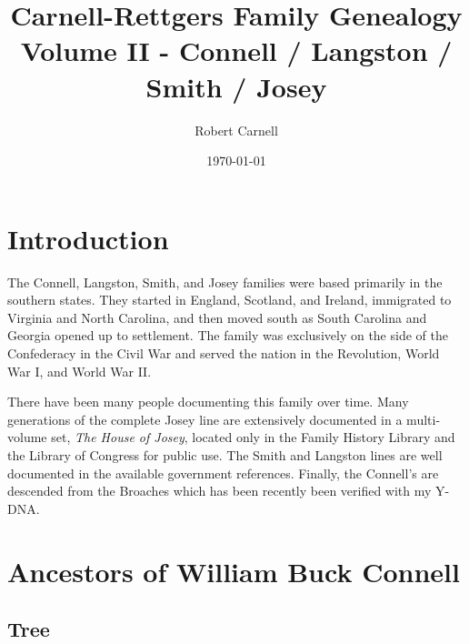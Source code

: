 \documentclass[11pt,letter]{book}
\title{\bf Carnell-Rettgers Family Genealogy \\
       \large Volume II - Connell / Langston / Smith / Josey}
\author{Robert Carnell}
\date{\today}
\begin{document}
\frontmatter
\maketitle
\tableofcontents
\mainmatter
\chapter{Introduction}

The Connell, Langston, Smith, and Josey families were based primarily in the southern states.  They started in England, Scotland, and Ireland, immigrated to Virginia and North Carolina, and then moved south as South Carolina and Georgia opened up to settlement.  The family was exclusively on the side of the Confederacy in the Civil War and served the nation in the Revolution, World War I, and World War II.

There have been many people documenting this family over time.  Many generations of the complete Josey line are extensively documented in a multi-volume set, \textit{The House of Josey}, located only in the Family History Library and the Library of Congress for public use.  The Smith and Langston lines are well documented in the available government references.  Finally, the Connell's are descended from the Broaches which has been recently been verified with my Y-DNA.

\chapter{Ancestors of William Buck Connell}

\section{Tree}

\end{document}
